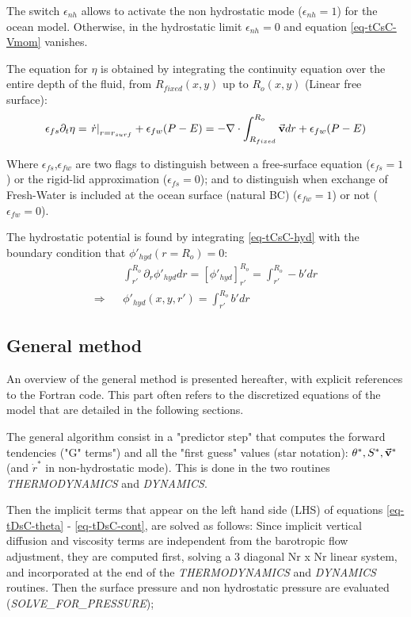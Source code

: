 The switch $\epsilon_{nh}$ allows to activate the non hydrostatic
mode ($\epsilon_{nh}=1$) for the ocean model. Otherwise, 
in the hydrostatic limit $\epsilon_{nh} = 0$ 
and equation \ref{eq-tCsC-Vmom} vanishes.

The equation for $\eta$ is obtained by integrating the 
continuity equation over the entire depth of the fluid, 
from $R_{fixed}(x,y)$ up to $R_o(x,y)$ 
(Linear free surface):
\begin{eqnarray}
\epsilon_{fs} \partial_t \eta =
\left. \dot{r} \right|_{r=r_{surf}} + \epsilon_{fw} (P-E) =
- {\bf \nabla} \cdot \int_{R_{fixed}}^{R_o} \vec{\bf v} dr
+ \epsilon_{fw} (P-E)
\label{eq-tCsC-eta}
\end{eqnarray}

Where $\epsilon_{fs}$,$\epsilon_{fw}$ are two flags to 
distinguish between a free-surface equation ($\epsilon_{fs}=1$) 
or the rigid-lid approximation ($\epsilon_{fs}=0$);  
and to distinguish when exchange of Fresh-Water is included 
at the ocean surface (natural BC) ($\epsilon_{fw} = 1$) 
or not ($\epsilon_{fw} = 0$).

The hydrostatic potential is found by
integrating \ref{eq-tCsC-hyd} with the boundary condition that
$\phi'_{hyd}(r=R_o) = 0$:
\begin{eqnarray*}
& &
\int_{r'}^{R_o} \partial_r \phi'_{hyd} dr =
\left[ \phi'_{hyd} \right]_{r'}^{R_o} =
\int_{r'}^{R_o} - b' dr
\\
\Rightarrow & &
\phi'_{hyd}(x,y,r') = \int_{r'}^{R_o} b' dr
\end{eqnarray*}

\subsection{General method}
 
An overview of the general method is presented hereafter, 
with explicit references to the Fortran code. This part
often refers to the discretized equations of the model
that are detailed in the following sections.

The general algorithm consist in  a "predictor step" that computes
the forward tendencies ("G" terms") and all 
the "first guess" values (star notation): 
$\theta^*, S^*, \vec{\bf v}^*$ (and $\dot{r}^*$
in non-hydrostatic mode). This is done in the two routines 
{\it THERMODYNAMICS} and {\it DYNAMICS}.

Then the implicit terms that appear on the left hand side (LHS)
of equations \ref{eq-tDsC-theta} - \ref{eq-tDsC-cont},
are solved as follows:
Since implicit vertical diffusion and viscosity terms 
are independent from the barotropic flow adjustment,
they are computed first, solving a 3 diagonal Nr x Nr linear system, 
and incorporated at the end of the {\it THERMODYNAMICS} and 
{\it DYNAMICS} routines.
Then the surface pressure and non hydrostatic pressure
are evaluated ({\it SOLVE\_FOR\_PRESSURE}); 

